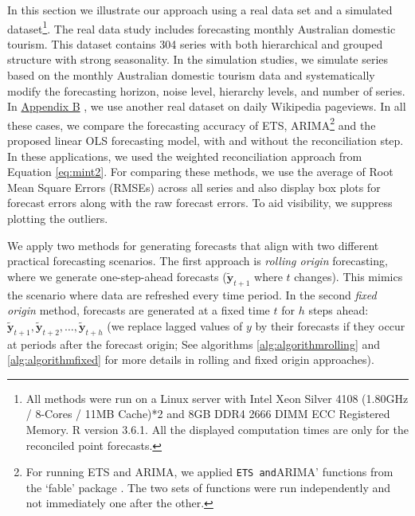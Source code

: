 \documentclass[11pt,a4paper,]{article}
\begin{document}
In this section we illustrate our approach using a real data set and a simulated dataset\footnote{All methods were run on a Linux server with Intel Xeon Silver 4108 (1.80GHz / 8-Cores / 11MB Cache)*2 and 8GB DDR4 2666 DIMM ECC Registered Memory. R version 3.6.1. All the displayed computation times are only for the reconciled point forecasts.}. The real data study includes forecasting monthly Australian domestic tourism. This dataset contains 304 series with both hierarchical and grouped structure with strong seasonality. In the simulation studies, we simulate series based on the monthly Australian domestic tourism data and systematically modify the forecasting horizon, noise level, hierarchy levels, and number of series. In \protect\hyperlink{appendixB}{Appendix B} , we use another real dataset on daily Wikipedia pageviews. In all these cases, we compare the forecasting accuracy of ETS, ARIMA\footnote{For running ETS and ARIMA, we applied \texttt{ETS\textquotesingle{}\ and}ARIMA' functions from the `fable' package \autocite{o2019fable}. The two sets of functions were run independently and not immediately one after the other.} and the proposed linear OLS forecasting model, with and without the reconciliation step. In these applications, we used the weighted reconciliation approach from Equation \eqref{eq:mint2}. For comparing these methods, we use the average of Root Mean Square Errors (RMSEs) across all series and also display box plots for forecast errors along with the raw forecast errors. To aid visibility, we suppress plotting the outliers.

We apply two methods for generating forecasts that align with two different practical forecasting scenarios. The first approach is \emph{rolling origin} forecasting, where we generate one-step-ahead forecasts (\(\tilde{\bm{y}}_{t+1}\) where \(t\) changes). This mimics the scenario where data are refreshed every time period. In the second \emph{fixed origin} method, forecasts are generated at a fixed time \(t\) for \(h\) steps ahead: \(\tilde{\bm{y}}_{t+1}, \tilde{\bm{y}}_{t+2},\dots, \tilde{\bm{y}}_{t+h}\) (we replace lagged values of \(y\) by their forecasts if they occur at periods after the forecast origin; See algorithms \ref{alg:algorithmrolling} and \ref{alg:algorithmfixed} for more details in rolling and fixed origin approaches).
\end{document}
